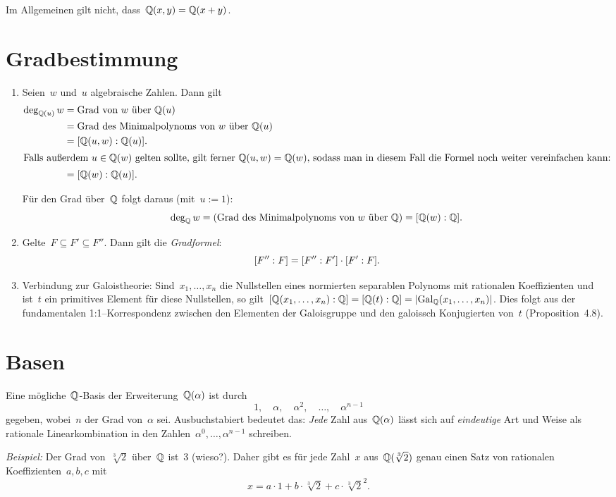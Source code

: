 \documentclass{../../algblatt}
\begin{document}
Im Allgemeinen gilt nicht, dass~$\mathbb{Q}(x,y) = \mathbb{Q}(x+y)$.


\section*{Gradbestimmung}

\begin{enumerate}
\item Seien~$w$ und~$u$ algebraische Zahlen. Dann gilt
\begin{align*}
  \deg_{\mathbb{Q}(u)} w &= \text{Grad von~$w$ über~$\mathbb{Q}(u)$} \\
  &= \text{Grad des Minimalpolynoms von~$w$ über~$\mathbb{Q}(u)$} \\
  &= [\mathbb{Q}(u,w):\mathbb{Q}(u)]. \\
\intertext{Falls außerdem~$u \in \mathbb{Q}(w)$ gelten sollte, gilt ferner~$\mathbb{Q}(u,w) =
\mathbb{Q}(w)$, sodass man in diesem Fall die Formel noch weiter vereinfachen kann:}
  &= [\mathbb{Q}(w):\mathbb{Q}(u)].
\end{align*}

Für den Grad über~$\mathbb{Q}$ folgt daraus (mit~$u := 1$):
\[ \deg_{\mathbb{Q}} w =
  \text{(Grad des Minimalpolynoms von~$w$ über~$\mathbb{Q}$)} =
  [\mathbb{Q}(w):\mathbb{Q}]. \]

\item Gelte~$F \subseteq F' \subseteq F''$. Dann gilt die \emph{Gradformel}:
\[ [F'':F] = [F'':F'] \cdot [F':F]. \]

\item Verbindung zur Galoistheorie: Sind~$x_1,\ldots,x_n$ die Nullstellen
eines normierten separablen Polynoms mit rationalen Koeffizienten und ist~$t$
ein primitives Element für diese Nullstellen, so
gilt~$[\mathbb{Q}(x_1,\ldots,x_n):\mathbb{Q}] = [\mathbb{Q}(t):\mathbb{Q}] =
|\mathrm{Gal}_{\mathbb{Q}}(x_1,\ldots,x_n)|$. Dies folgt aus der fundamentalen
1:1--Korrespondenz zwischen den Elementen der Galoisgruppe und den galoissch
Konjugierten von~$t$ (Proposition~4.8).
\end{enumerate}


\section*{Basen}

Eine mögliche~$\mathbb{Q}$-Basis der Erweiterung~$\mathbb{Q}(\alpha)$ ist durch
\[ 1,\quad \alpha,\quad \alpha^2,\quad \ldots,\quad \alpha^{n-1} \]
gegeben, wobei~$n$ der Grad von~$\alpha$ sei. Ausbuchstabiert bedeutet das:
\emph{Jede} Zahl aus~$\mathbb{Q}(\alpha)$ lässt sich auf \emph{eindeutige} Art und Weise als
rationale Linearkombination in den Zahlen~$\alpha^0,\ldots,\alpha^{n-1}$ schreiben.

\emph{Beispiel:} Der Grad von~$\sqrt[3]{2}$ über~$\mathbb{Q}$ ist~$3$ (wieso?). Daher
gibt es für jede Zahl~$x$ aus~$\mathbb{Q}(\sqrt[3]{2})$ genau einen Satz von
rationalen Koeffizienten~$a, b, c$ mit
\[ x = a \cdot 1 + b \cdot \sqrt[3]{2} + c \cdot \sqrt[3]{2}^2. \]
\end{document}

